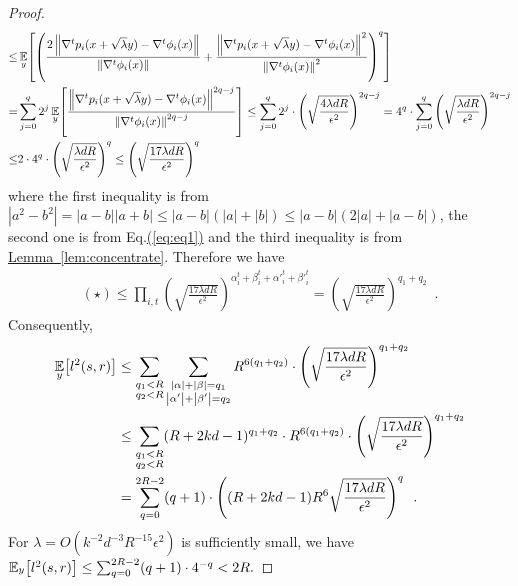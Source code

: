 \documentclass[12pt]{article}
\newcommand{\eq}[1]{\hyperref[eq:#1]{(\ref*{eq:#1})}}
\newcommand{\lem}[1]{\hyperref[lem:#1]{Lemma~\ref*{lem:#1}}}
\newcommand{\grad}[2]{\nabla^{#1}{#2}}
\newcommand{\br}[1]{\left(#1\right)} \newcommand{\Br}[1]{\left[#1\right]} \newcommand{\st}[1]{\left\{#1\right\}} \newcommand{\tr}[1]{\mathrm{Tr}\!\Br{#1}} \newcommand{\abs}[1]{\left|#1 \right|} \newcommand{\norm}[1]{\left\lVert #1 \right\rVert} \newcommand{\agl}[2]{\theta^{\br{#1}}_{#2}} \newcommand{\aglp}[2]{{\theta'}^{\br{#1}}_{#2}} \newcommand{\lint}[1]{\left\lfloor#1\right\rfloor} \newcommand{\poly}[1]{\mathrm{poly}\!\br{#1}} \newcommand{\negl}[1]{\mathrm{negl}\!\br{#1}} \newcommand{\de}[1]{\mathrm{d}#1} \newcommand{\val}[1]{\mathrm{val}\!\br{#1}} \newcommand{\vall}[1]{\mathrm{val}\br{#1}} \newcommand{\nd}[1]{\mathcal{N}\!\br{#1}} \newcommand{\ketbratwo}[2]{\ket{#1} \hspace{-0.4em}\bra{#2}} \newcommand{\ketbra}[1]{\ketbratwo{#1}{#1}} \newcommand{\id}{\ensuremath{\mathds{1}}} \newcommand{\ogroup}[1]{\mathrm{O}\!\br{#1}} \newcommand{\ugroup}[1]{\mathrm{U}\!\br{#1}} \newcommand{\td}{\mathrm{TD}} \newcommand{\tv}[1]{\norm{#1}_{\mathrm{TV}}} \newcommand {\defeq} {\ensuremath{ \stackrel{\mathrm{def}}{=} }} \newcommand{\vdim}{\ensuremath{N}} \newcommand{\dimin}{\ensuremath{n}} \newcommand{\dimout}{\ensuremath{m}} \newcommand{\ncopy}{\ell} \newcommand{\hspacein}{\H_\mathrm{in}} \newcommand{\hspaceout}{\H_\mathrm{out}} \newcommand{\Sin}{\S(\hspacein)} \newcommand{\Sout}{\S(\hspaceout)} \newcommand{\haar}{\ensuremath{\mu}} \newcommand{\tensorhaar}{\ensuremath{\eta}} \newcommand{\tensorsrss}{\ensuremath{\nu}} \newcommand{\qadvice}{\ensuremath{\rho}} \newcommand{\tp}{\otimes} \newcommand{\wone}[2]{W_1\!\br{#1,#2}}
\begin{document}
\begin{proof}
\begin{align*}
		\leq &\expect{y}{\br{
		\frac{
		2\norm{\grad{t}{p_i(x+\sqrt{\lambda}y)}-\grad{t}{\phi_i(x)}}
		}
		{\norm{\grad{t}{\phi_i(x)}}}
		+
		\frac{
		\norm{\grad{t}{p_i(x+\sqrt{\lambda}y)}-\grad{t}{\phi_i(x)}}^2
		}
		{\norm{\grad{t}{\phi_i(x)}}^2}
		}^q}\\
		= &\sum_{j=0}^q 2^j \expect{y}{\frac{
		\norm{\grad{t}{p_i(x+\sqrt{\lambda}y)}-\grad{t}{\phi_i(x)}}^{2q-j}
		}
		{\norm{\grad{t}{\phi_i(x)}}^{2q-j}}}
		\leq \sum_{j=0}^q 2^j \cdot \br{\sqrt{\frac{4\lambda d R}{\epsilon^2}}}^{2q-j}
		= 4^q\cdot\sum_{j=0}^q \br{\sqrt{\frac{\lambda d R}{\epsilon^2}}}^{2q-j}\\
		\leq & 2\cdot 4^q\cdot \br{\sqrt{\frac{\lambda d R}{\epsilon^2}}}^{q}
		\leq \br{\sqrt{\frac{17\lambda d R}{\epsilon^2}}}^{q}
	\end{align*}
	where the first inequality is from $\abs{a^2-b^2} = \abs{a-b}\abs{a+b}\leq  \abs{a-b}(\abs{a} + \abs{b}) \leq \abs{a-b}(2\abs{a}+\abs{a-b})$, the second one is from Eq.\eq{eq1} and the third inequality is from \lem{concentrate}.
	Therefore we have
	\begin{align*}
		(\star) \leq \prod_{i,t} \br{\sqrt{\frac{17\lambda d R}{\epsilon^2}}}^{ \alpha_i^t+\beta_i^t +{\alpha'}_i^t+{\beta'}_i^t } = \br{\sqrt{\frac{17\lambda d R}{\epsilon^2}}}^{ q_1+q_2} \enspace .
	\end{align*}
	Consequently,
	\begin{align*}
		\expect{y}{l^2(s,r)} &\leq \sum_{\substack{q_1<R\\q_2<R}}
		\sum_{\substack{ \abs{\alpha} +\abs{\beta} =q_1
					\\ \abs{\alpha'} +\abs{\beta'} =q_2 }}
					R^{6(q_1+q_2)}\cdot\br{\sqrt{\frac{17\lambda d R}{\epsilon^2}}}^{q_1+q_2} \\
		&\leq \sum_{\substack{q_1<R\\q_2<R}}
				(R+2kd-1)^{q_1+q_2}\cdot R^{6(q_1+q_2)}\cdot\br{\sqrt{\frac{17\lambda d R}{\epsilon^2}}}^{q_1+q_2}		\\
		&= \sum_{q=0}^{2R-2} (q+1)\cdot\br{(R+2kd-1)R^6\sqrt{\frac{17\lambda d R}{\epsilon^2}}}^q\enspace .
	\end{align*}
	For $\lambda = O(k^{-2}d^{-3}R^{-15}\epsilon^2)$ is sufficiently small, we have
	$
		\expect{y}{l^2(s,r)} \leq \sum_{q=0}^{2R-2} (q+1)\cdot 4^{-q} < 2R.
	$
	

\end{proof}
\end{document}
